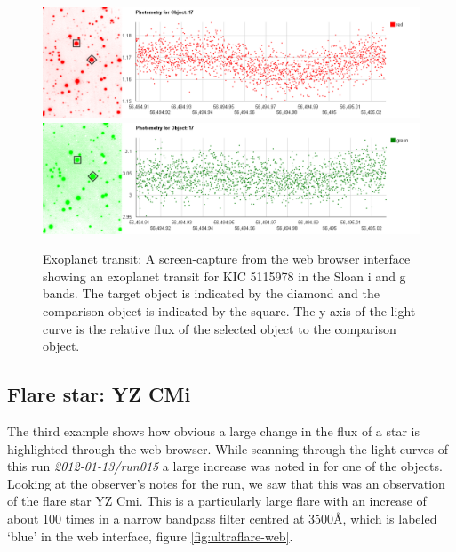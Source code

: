 \begin{figure}
\centering
\includegraphics[width=150mm]{images/koi823-r-lc.png}
\includegraphics[width=150mm]{images/koi823-g-lc.png}
\caption{Exoplanet transit: A screen-capture from the web browser interface showing an exoplanet transit for KIC 5115978 in the Sloan i and g bands. The target object is indicated by the diamond and the comparison object is indicated by the square. The y-axis of the light-curve is the relative flux of the selected object to the comparison object.}
\label{fig:gumus-discovery}
\end{figure}

\subsection{Flare star: YZ CMi}
The third example shows how obvious a large change in the flux of a star is highlighted through the web browser. While scanning through the light-curves of this run \emph{2012-01-13/run015} a large increase was noted in for one of the objects. Looking at the observer's notes for the run, we saw that this was an observation of the flare star YZ Cmi. This is a particularly large flare with an increase of about 100 times in a narrow bandpass filter centred at 3500\AA, which is labeled `blue' in the web interface, figure \ref{fig:ultraflare-web}.  

